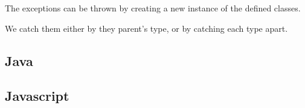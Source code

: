 \documentclass{KodeBook}
\begin{document}


The exceptions can be thrown by creating a new instance of the defined classes. 



We catch them either by they parent's type, or by catching each type apart. 




\subsection{Java}









\subsection{Javascript}





%
%
%
%
%
%
%
%
%
%
%
%
%




\ifx\wholebook\relax\else
% 
% 
	
\end{document}
